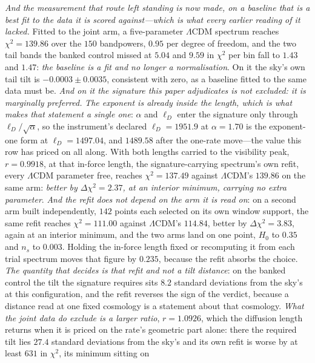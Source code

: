 \documentclass[11pt,a4paper]{article}
\theoremstyle{plain}
\theoremstyle{definition}
\theoremstyle{remark}
\begin{document}
\emph{And the measurement that route left standing is now made, on a baseline that is a best fit to
the data it is scored against---which is what every earlier reading of it lacked.} Fitted to the joint arm, a
five-parameter $\Lambda$CDM spectrum reaches $\chi^{2}=139.86$ over the $150$ bandpowers, $0.95$ per degree
of freedom, and the two tail bands the banked control missed at $5.04$ and $9.59$ in $\chi^{2}$ per bin fall
to $1.43$ and $1.47$: \emph{the baseline is a fit and no longer a normalisation}. On it the sky's own tail
tilt is $-0.0003\pm0.0035$, consistent with zero, as a baseline fitted to the same data must be.
\emph{And on it the signature this paper adjudicates is not excluded: it is marginally preferred.}
\emph{The exponent is already inside the length, which is what makes that statement a single one}: $\alpha$
and $\ell_D$ enter the signature only through $\ell_D/\sqrt\alpha$, so the instrument's declared
$\ell_D=1951.9$ at $\alpha=1.70$ is the exponent-one form at $\ell_D=1497.04$, and $1489.58$ after the
one-rate move---the value this row has priced on all along. With both lengths carried to the visibility
peak, $r=0.9918$, at that in-force length, the signature-carrying spectrum's own refit, every
$\Lambda$CDM parameter free, reaches $\chi^{2}=137.49$ against $\Lambda$CDM's $139.86$ on the same arm:
\emph{better by $\Delta\chi^{2}=2.37$, at an interior minimum, carrying no extra parameter}.
\emph{And the refit does not depend on the arm it is read on}: on a second arm built independently, $142$
points each selected on its own window support, the same refit reaches $\chi^{2}=111.00$ against
$\Lambda$CDM's $114.84$, better by $\Delta\chi^{2}=3.83$, again at an interior minimum, and the two arms
land on one point, $H_0$ to $0.35$ and $n_s$ to $0.003$. Holding the in-force length fixed or recomputing
it from each trial spectrum moves that figure by $0.235$, because the refit absorbs the choice.
\emph{The quantity that decides is that refit and not a tilt distance}: on the banked control the tilt the
signature requires sits $8.2$ standard deviations from the sky's at this configuration, and the refit
reverses the sign of the verdict, because a distance read at one fixed cosmology is a statement about that
cosmology. \emph{What the joint data do exclude is a larger ratio}, $r=1.0926$, which the diffusion length
returns when it is priced on the rate's geometric part alone: there the required tilt lies $27.4$ standard
deviations from the sky's and its own refit is worse by at least $631$ in $\chi^{2}$, its minimum sitting on
\end{document}
